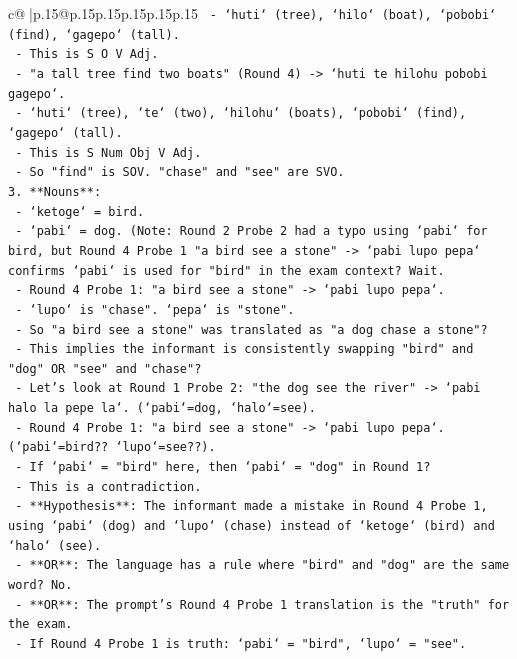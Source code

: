 \documentclass{article}
\begin{document}
{\begin{supertabular}{c@{$\;$}|p{.15\linewidth}@{}p{.15\linewidth}p{.15\linewidth}p{.15\linewidth}p{.15\linewidth}p{.15\linewidth}}
{{{\texttt{      {-} `huti` (tree), `hilo` (boat), `pobobi` (find), `gagepo` (tall).} \\
\texttt{      {-} This is S O V Adj.} \\
\texttt{    {-} "a tall tree find two boats" (Round 4) {-}> `huti te hilohu pobobi gagepo`.} \\
\texttt{      {-} `huti` (tree), `te` (two), `hilohu` (boats), `pobobi` (find), `gagepo` (tall).} \\
\texttt{      {-} This is S Num Obj V Adj.} \\
\texttt{      {-} So "find" is SOV. "chase" and "see" are SVO.} \\
\texttt{3.  **Nouns**:} \\
\texttt{    {-} `ketoge` = bird.} \\
\texttt{    {-} `pabi` = dog. (Note: Round 2 Probe 2 had a typo using `pabi` for bird, but Round 4 Probe 1 "a bird see a stone" {-}> `pabi lupo pepa` confirms `pabi` is used for "bird" in the exam context? Wait.} \\
\texttt{    {-} Round 4 Probe 1: "a bird see a stone" {-}> `pabi lupo pepa`.} \\
\texttt{    {-} `lupo` is "chase". `pepa` is "stone".} \\
\texttt{    {-} So "a bird see a stone" was translated as "a dog chase a stone"?} \\
\texttt{    {-} This implies the informant is consistently swapping "bird" and "dog" OR "see" and "chase"?} \\
\texttt{    {-} Let's look at Round 1 Probe 2: "the dog see the river" {-}> `pabi halo la pepe la`. (`pabi`=dog, `halo`=see).} \\
\texttt{    {-} Round 4 Probe 1: "a bird see a stone" {-}> `pabi lupo pepa`. (`pabi`=bird?? `lupo`=see??).} \\
\texttt{    {-} If `pabi` = "bird" here, then `pabi` = "dog" in Round 1?} \\
\texttt{    {-} This is a contradiction.} \\
\texttt{    {-} **Hypothesis**: The informant made a mistake in Round 4 Probe 1, using `pabi` (dog) and `lupo` (chase) instead of `ketoge` (bird) and `halo` (see).} \\
\texttt{    {-} **OR**: The language has a rule where "bird" and "dog" are the same word? No.} \\
\texttt{    {-} **OR**: The prompt's Round 4 Probe 1 translation is the "truth" for the exam.} \\
\texttt{    {-} If Round 4 Probe 1 is truth: `pabi` = "bird", `lupo` = "see".} \\
}}}
\end{supertabular}}
\end{document}
